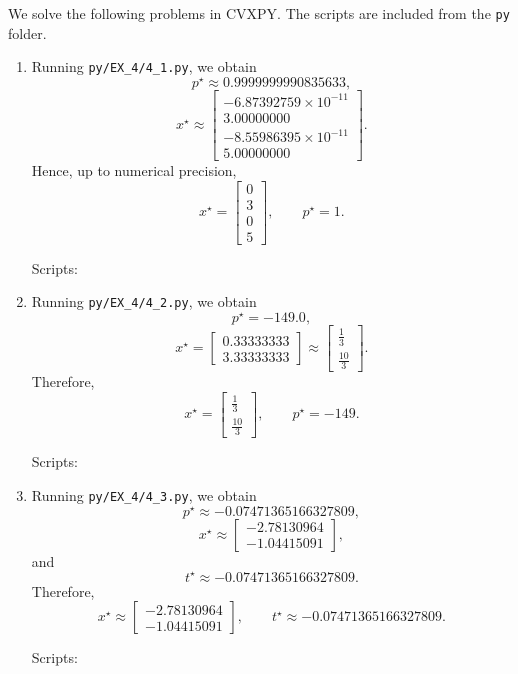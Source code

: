\documentclass[11pt,letter,notitlepage]{article}
\theoremstyle{definition}
\begin{document}
\newpage

\begin{solution}

We solve the following problems in CVXPY. The scripts are included from the \texttt{py} folder.

\begin{enumerate}[label=(\alph*)]

\item
Running \texttt{py/EX\_4/4\_1.py}, we obtain
\[
p^\star \approx 0.9999999990835633,
\]
\[
x^\star \approx
\begin{bmatrix}
-6.87392759\times 10^{-11}\\
3.00000000\\
-8.55986395\times 10^{-11}\\
5.00000000
\end{bmatrix}.
\]
Hence, up to numerical precision,
\[
x^\star=
\begin{bmatrix}
0\\
3\\
0\\
5
\end{bmatrix},
\qquad
p^\star=1.
\]

Scripts:


\item
Running \texttt{py/EX\_4/4\_2.py}, we obtain
\[
p^\star=-149.0,
\]
\[
x^\star=
\begin{bmatrix}
0.33333333\\
3.33333333
\end{bmatrix}
\approx
\begin{bmatrix}
\frac13\\
\frac{10}{3}
\end{bmatrix}.
\]
Therefore,
\[
x^\star=
\begin{bmatrix}
\frac13\\
\frac{10}{3}
\end{bmatrix},
\qquad
p^\star=-149.
\]

Scripts:


\item
Running \texttt{py/EX\_4/4\_3.py}, we obtain
\[
p^\star \approx -0.07471365166327809,
\]
\[
x^\star \approx
\begin{bmatrix}
-2.78130964\\
-1.04415091
\end{bmatrix},
\]
and
\[
t^\star \approx -0.07471365166327809.
\]
Therefore,
\[
x^\star \approx
\begin{bmatrix}
-2.78130964\\
-1.04415091
\end{bmatrix},
\qquad
t^\star \approx -0.07471365166327809.
\]

Scripts:


\end{enumerate}

\end{solution}
\end{document}
